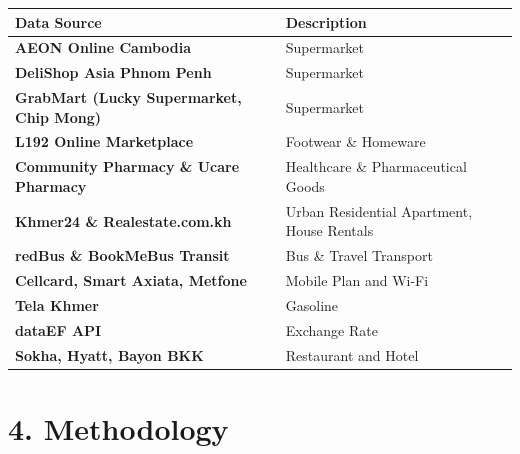 \documentclass[10pt,a4paper]{article}
\begin{document}
\noindent
\footnotesize
\renewcommand{\arraystretch}{0.80}
\begin{tabularx}{\textwidth}{@{}>{\bfseries}p{5.5cm}X@{}}
\toprule
\rowcolor{NavyBlue!15} Data Source & Description \\ \midrule
AEON Online Cambodia & Supermarket \\ \addlinespace
\rowcolor{RowTint} DeliShop Asia Phnom Penh & Supermarket \\ \addlinespace
GrabMart (Lucky Supermarket, Chip Mong) & Supermarket \\ \addlinespace
\rowcolor{RowTint} L192 Online Marketplace & Footwear \& Homeware \\ \addlinespace
Community Pharmacy \& Ucare Pharmacy & Healthcare \& Pharmaceutical Goods \\ \addlinespace
\rowcolor{RowTint} Khmer24 \& Realestate.com.kh & Urban Residential Apartment, House Rentals \\ \addlinespace
redBus \& BookMeBus Transit & Bus \& Travel Transport \\ \addlinespace
\rowcolor{RowTint} Cellcard, Smart Axiata, Metfone & Mobile Plan and Wi-Fi \\ \addlinespace
Tela Khmer & Gasoline \\ \addlinespace
\rowcolor{RowTint} dataEF API & Exchange Rate \\ \addlinespace
Sokha, Hyatt, Bayon BKK & Restaurant and Hotel \\ \bottomrule
\end{tabularx}

\clearpage

\section*{4. Methodology}
\end{document}
